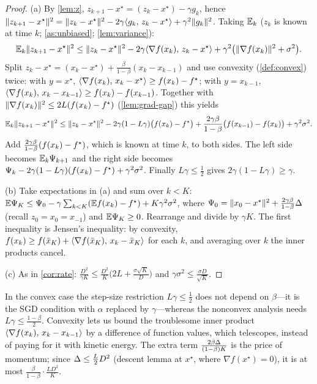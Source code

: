 \begin{proof}
(a) By \cref{lem:z}, $z_{k+1}-x^\star=(z_k-x^\star)-\gamma g_k$, hence
$\lVert z_{k+1}-x^\star\rVert^2=\lVert z_k-x^\star\rVert^2-2\gamma\langle g_k,\, z_k-x^\star\rangle+\gamma^2\lVert g_k\rVert^2$.
Taking $\mathbb{E}_k$ ($z_k$ is known at time $k$; \cref{as:unbiased}; \cref{lem:variance}):
\[
  \mathbb{E}_k\lVert z_{k+1}-x^\star\rVert^2\le\lVert z_k-x^\star\rVert^2-2\gamma\langle \nabla f(x_k),\, z_k-x^\star\rangle
  +\gamma^2\bigl(\lVert \nabla f(x_k)\rVert^2+\sigma^2\bigr).
\]
Split $z_k-x^\star=(x_k-x^\star)+\frac{\beta}{1-\beta}(x_k-x_{k-1})$ and use convexity
(\cref{def:convex}) twice: with $y=x^\star$,
$\langle \nabla f(x_k),\, x_k-x^\star\rangle\ge f(x_k)-f^\star$; with $y=x_{k-1}$,
$\langle \nabla f(x_k),\, x_k-x_{k-1}\rangle\ge f(x_k)-f(x_{k-1})$. Together with
$\lVert \nabla f(x_k)\rVert^2\le2L(f(x_k)-f^\star)$ (\cref{lem:grad-gap}) this yields
\[
  \mathbb{E}_k\lVert z_{k+1}-x^\star\rVert^2\le\lVert z_k-x^\star\rVert^2-2\gamma(1-L\gamma)\bigl(f(x_k)-f^\star\bigr)
  +\frac{2\gamma\beta}{1-\beta}\bigl(f(x_{k-1})-f(x_k)\bigr)+\gamma^2\sigma^2 .
\]
Add $\frac{2\gamma\beta}{1-\beta}(f(x_k)-f^\star)$, which is known at time $k$, to both
sides. The left side becomes $\mathbb{E}_k\Psi_{k+1}$ and the right side becomes
$\Psi_k-2\gamma(1-L\gamma)(f(x_k)-f^\star)+\gamma^2\sigma^2$. Finally $L\gamma\le\frac12$ gives
$2\gamma(1-L\gamma)\ge\gamma$.

(b) Take expectations in (a) and sum over $k<K$:
$\mathbb{E}\Psi_K\le\Psi_0-\gamma\sum_{k<K}(\mathbb{E} f(x_k)-f^\star)+K\gamma^2\sigma^2$, where
$\Psi_0=\lVert x_0-x^\star\rVert^2+\frac{2\gamma\beta}{1-\beta}\Delta$ (recall $z_0=x_0=x_{-1}$) and
$\mathbb{E}\Psi_K\ge0$. Rearrange and divide by $\gamma K$. The first inequality is Jensen's
inequality: by convexity, $f(x_k)\ge f(\bar x_K)+\langle \nabla f(\bar x_K),\, x_k-\bar x_K\rangle$
for each $k$, and averaging over $k$ the inner products cancel.

(c) As in \cref{cor:rate}: $\frac{D^2}{\gamma K}\le\frac{D^2}{K}\bigl(2L+\frac{\sigma\sqrt K}{D}\bigr)$ and
$\gamma\sigma^2\le\frac{\sigma D}{\sqrt K}$.
\end{proof}

\begin{remark}
In the convex case the step-size restriction $L\gamma\le\frac12$ does not depend on
$\beta$---it is the SGD condition with $\alpha$ replaced by $\gamma$---whereas the
nonconvex analysis needs $L\gamma\le\frac{1-\beta}2$. Convexity lets us bound the
troublesome inner product $\langle \nabla f(x_k),\, x_k-x_{k-1}\rangle$ by a difference of function
values, which telescopes, instead of paying for it with kinetic energy. The extra term
$\frac{2\beta\Delta}{(1-\beta)K}$ is the price of momentum; since $\Delta\le\frac L2D^2$ (descent
lemma at $x^\star$, where $\nabla f(x^\star)=0$), it is at most
$\frac{\beta}{1-\beta}\cdot\frac{LD^2}{K}$.
\end{remark}
